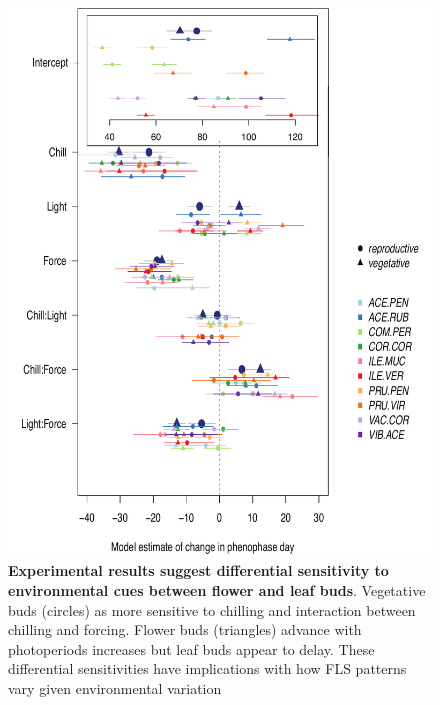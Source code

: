 \documentclass[11pt]{article}
\begin{document}
\begin{figure}[h!]
    \centering
 \includegraphics[width=\textwidth]{..//Plots/Flobuds_manuscript_figs/budburstvsflowering.pdf}
    \caption{\textbf{Experimental results suggest differential sensitivity to environmental cues between flower and leaf buds}. Vegetative buds (circles) as more sensitive to chilling and interaction between chilling and forcing. Flower buds (triangles) advance with photoperiods increases but leaf buds appear to delay. These differential sensitivities have implications with how FLS patterns vary given environmental variation}
    \label{fig:model}
\end{figure}
\end{document}
